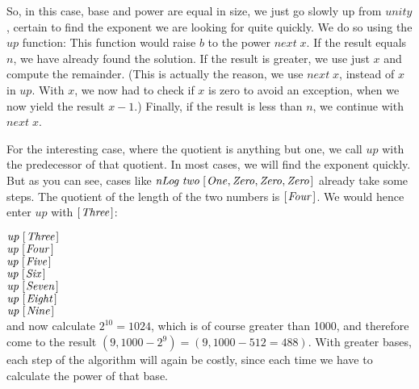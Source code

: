 \documentclass{scrreprt}
\newcommand{\Conid}[1]{\mathit{#1}}
\newcommand{\Varid}[1]{\mathit{#1}}
\begin{document}
{So, in this case, base and power are equal in size,
we just go slowly up from \ensuremath{\Varid{unity}},
certain to find the exponent we are looking for quite quickly.
We do so using the \ensuremath{\Varid{up}} function:
This function would raise \ensuremath{\Varid{b}} to the power \ensuremath{\Varid{next}\;\Varid{x}}.
If the result equals \ensuremath{\Varid{n}}, we have already found the solution.
If the result is greater, we use just \ensuremath{\Varid{x}} and compute the remainder.
(This is actually the reason, we use \ensuremath{\Varid{next}\;\Varid{x}}, instead of \ensuremath{\Varid{x}} in \ensuremath{\Varid{up}}.
 With \ensuremath{\Varid{x}}, we now had to check if \ensuremath{\Varid{x}} is zero to avoid
 an exception, when we now yield the result $x - 1$.)
Finally, if the result is less than \ensuremath{\Varid{n}}, we continue with \ensuremath{\Varid{next}\;\Varid{x}}.

For the interesting case,
where the quotient is anything but one,
we call \ensuremath{\Varid{up}} with the predecessor of that quotient.
In most cases, we will find the exponent quickly.
But as you can see, cases like \ensuremath{\Varid{nLog}\;\Varid{two}\;[\mskip1.5mu \Conid{One},\Conid{Zero},\Conid{Zero},\Conid{Zero}\mskip1.5mu]}
already take some steps.
The quotient of the length of the two numbers
is \ensuremath{[\mskip1.5mu \Conid{Four}\mskip1.5mu]}. We would hence enter \ensuremath{\Varid{up}} with \ensuremath{[\mskip1.5mu \Conid{Three}\mskip1.5mu]}:

\ensuremath{\Varid{up}\;[\mskip1.5mu \Conid{Three}\mskip1.5mu]}\\
\ensuremath{\Varid{up}\;[\mskip1.5mu \Conid{Four}\mskip1.5mu]}\\
\ensuremath{\Varid{up}\;[\mskip1.5mu \Conid{Five}\mskip1.5mu]}\\
\ensuremath{\Varid{up}\;[\mskip1.5mu \Conid{Six}\mskip1.5mu]}\\
\ensuremath{\Varid{up}\;[\mskip1.5mu \Conid{Seven}\mskip1.5mu]}\\
\ensuremath{\Varid{up}\;[\mskip1.5mu \Conid{Eight}\mskip1.5mu]}\\
\ensuremath{\Varid{up}\;[\mskip1.5mu \Conid{Nine}\mskip1.5mu]}\\

and now calculate $2^{10} = 1024$,
which is of course greater than \num{1000},
and therefore come to the result
$(9, 1000 - 2^9) = (9, 1000 - 512 = 488)$.
With greater bases,
each step of the algorithm will again be costly,
since each time we have to calculate the power
of that base.
}
\end{document}
